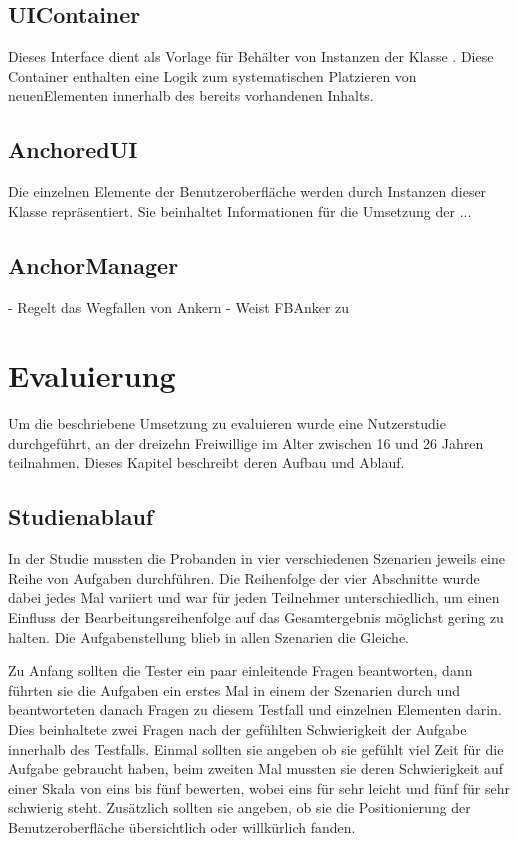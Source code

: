 		\subsection{UIContainer}
			Dieses Interface dient als Vorlage für Behälter von Instanzen der Klasse . \linebreak Diese Container enthalten eine Logik zum systematischen Platzieren von neuen\linebreak Elementen innerhalb des bereits vorhandenen Inhalts.
		
		\subsection{AnchoredUI}
			Die einzelnen Elemente der Benutzeroberfläche werden durch Instanzen dieser Klasse repräsentiert. Sie beinhaltet Informationen für die Umsetzung der ...
		
		\subsection{AnchorManager}
			- Regelt das Wegfallen von Ankern
			- Weist FBAnker zu
			
	\section{Evaluierung}
		Um die beschriebene Umsetzung zu evaluieren wurde eine Nutzerstudie durchgeführt, an der dreizehn Freiwillige im Alter zwischen 16 und 26 Jahren teilnahmen. Dieses Kapitel beschreibt deren Aufbau und Ablauf.
	
		\subsection{Studienablauf}
			In der Studie mussten die Probanden in vier verschiedenen Szenarien jeweils eine Reihe von Aufgaben durchführen. Die Reihenfolge der vier Abschnitte wurde dabei jedes Mal variiert und war für jeden Teilnehmer unterschiedlich, um einen Einfluss der Bearbeitungsreihenfolge auf das Gesamtergebnis möglichst gering zu halten. Die Aufgabenstellung blieb in allen Szenarien die Gleiche.
			
			
						
			Zu Anfang sollten die Tester ein paar einleitende Fragen beantworten, dann führten sie die Aufgaben ein erstes Mal in einem der Szenarien durch und beantworteten danach Fragen zu diesem Testfall und einzelnen Elementen darin. 
			Dies beinhaltete zwei Fragen nach der gefühlten Schwierigkeit der Aufgabe innerhalb des Testfalls. Einmal sollten sie angeben ob sie gefühlt viel Zeit für die Aufgabe gebraucht haben, beim zweiten Mal mussten sie deren Schwierigkeit auf einer Skala von eins bis fünf bewerten, wobei eins für sehr leicht und fünf für sehr schwierig steht. Zusätzlich sollten sie angeben, ob sie die Positionierung der Benutzeroberfläche übersichtlich oder willkürlich fanden.
			
